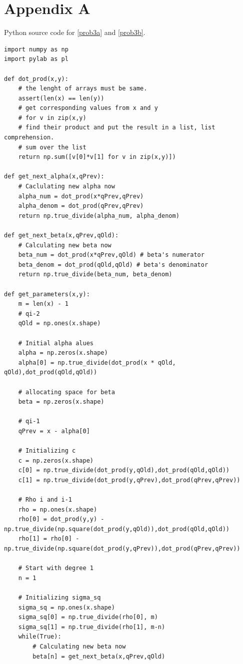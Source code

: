 \documentclass[a4paper,11pt]{article}
\begin{document}
\section{Appendix A}\label{code:problem3a}
Python source code for \ref{prob3a} and \ref{prob3b}.
{\footnotesize
\begin{lstlisting}
import numpy as np
import pylab as pl

def dot_prod(x,y):
    # the lenght of arrays must be same.
    assert(len(x) == len(y))
    # get corresponding values from x and y 
    # for v in zip(x,y)
    # find their product and put the result in a list, list comprehension.
    # sum over the list
    return np.sum([v[0]*v[1] for v in zip(x,y)])

def get_next_alpha(x,qPrev):
    # Caclulating new alpha now
    alpha_num = dot_prod(x*qPrev,qPrev)
    alpha_denom = dot_prod(qPrev,qPrev)
    return np.true_divide(alpha_num, alpha_denom) 

def get_next_beta(x,qPrev,qOld):
    # Calculating new beta now
    beta_num = dot_prod(x*qPrev,qOld) # beta's numerator
    beta_denom = dot_prod(qOld,qOld) # beta's denominator
    return np.true_divide(beta_num, beta_denom) 

def get_parameters(x,y):
    m = len(x) - 1
    # qi-2
    qOld = np.ones(x.shape)

    # Initial alpha alues
    alpha = np.zeros(x.shape)
    alpha[0] = np.true_divide(dot_prod(x * qOld, qOld),dot_prod(qOld,qOld))

    # allocating space for beta
    beta = np.zeros(x.shape)

    # qi-1
    qPrev = x - alpha[0]

    # Initializing c
    c = np.zeros(x.shape)
    c[0] = np.true_divide(dot_prod(y,qOld),dot_prod(qOld,qOld))
    c[1] = np.true_divide(dot_prod(y,qPrev),dot_prod(qPrev,qPrev))

    # Rho i and i-1
    rho = np.ones(x.shape)
    rho[0] = dot_prod(y,y) - np.true_divide(np.square(dot_prod(y,qOld)),dot_prod(qOld,qOld))
    rho[1] = rho[0] - np.true_divide(np.square(dot_prod(y,qPrev)),dot_prod(qPrev,qPrev))

    # Start with degree 1
    n = 1 

    # Initializing sigma_sq
    sigma_sq = np.ones(x.shape)
    sigma_sq[0] = np.true_divide(rho[0], m)
    sigma_sq[1] = np.true_divide(rho[1], m-n) 
    while(True):
        # Calculating new beta now
        beta[n] = get_next_beta(x,qPrev,qOld)
        

\end{lstlisting}}
\end{document}
